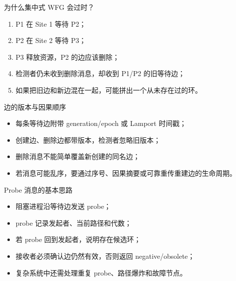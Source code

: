 \documentclass[UTF8,fontset=none,aspectratio=169,10pt]{beamer}
\begin{document}

\begin{frame}{为什么集中式 WFG 会过时？}
\begin{enumerate}
  \item P1 在 Site 1 等待 P2；
  \item P2 在 Site 2 等待 P3；
  \item P3 释放资源，P2 的边应该删除；
  \item 检测者仍未收到删除消息，却收到 P1/P2 的旧等待边；
  \item 如果把旧边和新边混在一起，可能拼出一个从未存在过的环。
\end{enumerate}
\end{frame}

\begin{frame}{边的版本与因果顺序}
\begin{itemize}
  \item 每条等待边附带 generation/epoch 或 Lamport 时间戳；
  \item 创建边、删除边都带版本，检测者忽略旧版本；
  \item 删除消息不能简单覆盖新创建的同名边；
  \item 若消息可能乱序，要通过序号、因果摘要或可靠重传重建边的生命周期。
\end{itemize}
\vfill
{}
\end{frame}

\begin{frame}{Probe 消息的基本思路}
\begin{itemize}
  \item 阻塞进程沿等待边发送 probe；
  \item probe 记录发起者、当前路径和代数；
  \item 若 probe 回到发起者，说明存在候选环；
  \item 接收者必须确认边仍然有效，否则返回 negative/obsolete；
  \item 复杂系统中还需处理重复 probe、路径爆炸和故障节点。
\end{itemize}
\end{frame}
\end{document}

